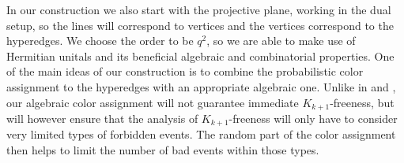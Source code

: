 \documentclass[12pt]{article}
\theoremstyle{definition}
\begin{document}
	In our construction we also start with the projective plane, working in the dual setup, so the lines will correspond to vertices and the vertices correspond to the hyperedges. We choose the order to be $q^2$, so we are able to make use of Hermitian unitals and its beneficial algebraic and combinatorial properties. One of the main ideas of our construction is to combine the probabilistic color assignment to the hyperedges with an appropriate algebraic one. Unlike in \cite{fox2016minimum} and \cite{bamberg2022minimum}, our algebraic color assignment will not guarantee immediate $K_{k+1}$-freeness, but will however ensure that the analysis of $K_{k+1}$-freeness will only have to consider very limited types of forbidden events. The random part of the color assignment then helps to limit the number of bad events within those types. 
	
\end{document}
